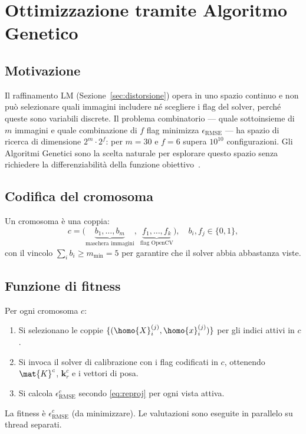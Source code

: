 \section{Ottimizzazione tramite Algoritmo Genetico}
\label{sec:ga}

\subsection{Motivazione}

Il raffinamento LM (Sezione~\ref{sec:distorsione}) opera in uno spazio
continuo e non può selezionare quali immagini includere né scegliere i
flag del solver, perché queste sono variabili discrete. Il problema
combinatorio --- quale sottoinsieme di \(m\) immagini e quale
combinazione di \(f\) flag minimizza \(\epsilon_{\text{RMSE}}\) --- ha
spazio di ricerca di dimensione \(2^m\cdot2^f\): per \(m=30\) e \(f=6\)
supera \(10^{10}\) configurazioni. Gli Algoritmi Genetici sono la
scelta naturale per esplorare questo spazio senza richiedere la
differenziabilità della funzione obiettivo~\cite{Marinescu2021}.

\subsection{Codifica del cromosoma}

Un cromosoma è una coppia:
\[
  c = \bigl(
    \underbrace{b_1,\dots,b_m}_{\text{maschera immagini}},\;
    \underbrace{f_1,\dots,f_k}_{\text{flag OpenCV}}
  \bigr),
  \quad b_i,f_j\in\{0,1\},
\]
con il vincolo \(\sum_i b_i \geq m_{\min}=5\) per garantire che il
solver abbia abbastanza viste.

\subsection{Funzione di fitness}

Per ogni cromosoma \(c\):
\begin{enumerate}[label=\arabic*.]
  \item Si selezionano le coppie
        \(\{(\homo{X}_i^{(j)},\homo{x}_i^{(j)})\}\) per gli indici
        attivi in \(c\).
  \item Si invoca il solver di calibrazione con i flag codificati in
        \(c\), ottenendo \(\mat{K}^c\), \(\mathbf{k}_r^c\) e i
        vettori di posa.
  \item Si calcola \(\epsilon_{\text{RMSE}}^c\) secondo
        \eqref{eq:reproj} per ogni vista attiva.
\end{enumerate}
La fitness è \(\epsilon_{\text{RMSE}}^c\) (da minimizzare).
Le valutazioni sono eseguite in parallelo su thread separati.


